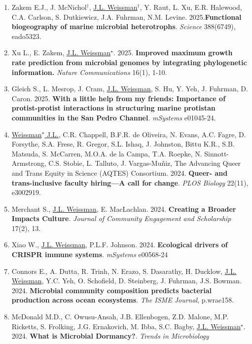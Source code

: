 \documentclass[]{res}
\begin{document}
\begin{resume}
\begin{enumerate}[leftmargin=*]
 
\item Zakem E.J., J. McNichol$^\dagger$, \underline{J.L. Weissman}$^\dagger$, Y. Raut, L. Xu, E.R. Halewood, C.A. Carlson, S. Dutkiewicz, J.A. Fuhrman, N.M. Levine. 2025.{\bf Functional biogeography of marine microbial heterotrophs}. \emph{Science} 388(6749), eado5323.
 
\item Xu L., E. Zakem, \underline{J.L. Weissman$^\star$}. 2025. {\bf Improved maximum growth rate prediction from microbial genomes by integrating phylogenetic information.} \emph{Nature Communications} 16(1), 1-10.

\item Gleich S., L. Mesrop, J. Cram, \underline{J.L. Weissman}, S. Hu, Y. Yeh, J. Fuhrman, D. Caron. 2025. {\bf With a little help from my friends: Importance of protist-protist interactions in structuring marine protistan communities in the San Pedro Channel}. \emph{mSystems} e01045-24.
 
\item \underline{Weissman$^\star$ J.L.}, C.R. Chappell, B.F.R. de Oliveira, N. Evans, A.C. Fagre, D. Forsythe, S.A. Frese, R. Gregor, S.L. Ishaq, J. Johnston, Bittu K.R., S.B. Matsuda, S. McCarren, M.O.A. de la Campa, T.A. Roepke, N. Sinnott-Armstrong, C.S. Stobie, L. Talluto, J. Vargas-Muñiz, The Advancing Queer and Trans Equity in Science (AQTES) Consortium. 2024. {\bf Queer- and trans-inclusive faculty hiring—A call for change}. \emph{PLOS Biology} 22(11), e3002919.
 
 \item Merchant S., \underline{J.L. Weissman}, E. MacLachlan. 2024. {\bf Creating a Broader Impacts Culture}. \emph{Journal of Community Engagement and Scholarship} 17(2), 13.
 
 \item Xiao W., \underline{J.L. Weissman}, P.L.F. Johnson. 2024. {\bf Ecological drivers of CRISPR immune systems}. \emph{mSystems} e00568-24
 
 \item Connors E., A. Dutta, R. Trinh, N. Erazo, S. Dasarathy, H. Ducklow, \underline{J.L. Weissman}, Y.C. Yeh, O. Schofield, D. Steinberg, J. Fuhrman, J.S. Bowman. 2024. {\bf Microbial community composition predicts bacterial production across ocean ecosystems}. \emph{The ISME Journal}, p.wrae158.

 \item McDonald M.D., C. Owusu-Ansah, J.B. Ellenbogen, Z.D. Malone, M.P. Ricketts, S. Frolking, J.G. Ernakovich, M. Ibba, S.C. Bagby, \underline{J.L. Weissman$^\star$}. 2024. {\bf What is Microbial Dormancy?}. \emph{Trends in Microbiology}


\end{enumerate}
\end{resume}
\end{document}
